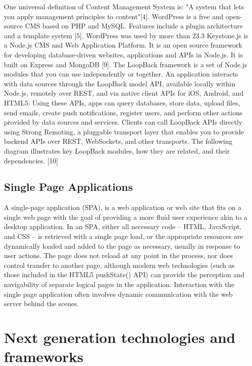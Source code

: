 \documentclass{sig-alternate}
\begin{document}
One universal definition of Content Management System is: "A system that lets you apply management principles to content"[4].
WordPress is a free and open-source CMS based on PHP and MySQL. Features include a plugin architecture and a template system [5]. WordPress was used by more than 23.3%
Keystone.js is a Node.js CMS and Web Application Platform. It is an open source framework for developing database-driven websites, applications and APIs in Node.js. It is built on Express and MongoDB [9].
The LoopBack framework is a set of Node.js modules that you can use independently or together.  
An application interacts with data sources through the LoopBack model API, available locally within Node.js, remotely over REST, and via native client APIs for iOS, Android, and HTML5. Using these APIs, apps can query databases, store data, upload files, send emails, create push notifications, register users, and perform other actions provided by data sources and services.
Clients can call LoopBack APIs directly using Strong Remoting, a pluggable transport layer that enables you to provide backend APIs over REST, WebSockets, and other transports.
The following diagram illustrates key LoopBack modules, how they are related, and their dependencies. [10]

\subsection{Single Page Applications}

A single-page application (SPA), is a web application or web site that fits on a single web page with the goal of providing a more fluid user experience akin to a desktop application. In an SPA, either all necessary code – HTML, JavaScript, and CSS – is retrieved with a single page load, or the appropriate resources are dynamically loaded and added to the page as necessary, usually in response to user actions. The page does not reload at any point in the process, nor does control transfer to another page, although modern web technologies (such as those included in the HTML5 pushState() API) can provide the perception and navigability of separate logical pages in the application. Interaction with the single page application often involves dynamic communication with the web server behind the scenes.

\section{Next generation technologies and frameworks}
\end{document}
